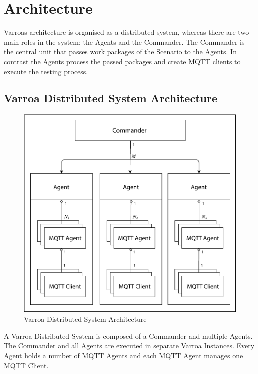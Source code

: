 \chapter{Architecture}\label{sec:Architecture}
Varroas architecture is organised as a distributed system, whereas there are two main roles in the system: the Agents and the Commander.
The Commander is the central unit that passes work packages of the Scenario to the Agents.
In contrast the Agents process the passed packages and create MQTT clients to execute the testing process.

\section{Varroa Distributed System Architecture}
\begin{figure}[h]
	\begin{center}
	\includegraphics[scale=0.65]{Resources/PDF/Architecture}
	\caption{Varroa Distributed System Architecture}
	\label{pic:Architecture}
	\end{center}
\end{figure}
A Varroa Distributed System is composed of a Commander and multiple Agents.
The Commander and all Agents are executed in separate Varroa Instances.
Every Agent holds a number of MQTT Agents and each MQTT Agent manages one MQTT Client.
\newpage


